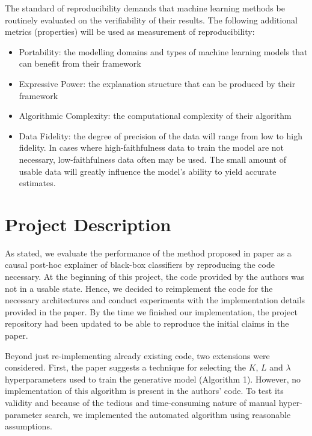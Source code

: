 The standard of reproducibility demands that machine learning methods be routinely evaluated on the verifiability of their results. The following additional metrics (properties) will be used as measurement of reproducibility:
\begin{itemize}
	\item Portability: the modelling domains and types of machine learning models that can benefit from their framework %
	\item Expressive Power: the explanation structure that can be produced by their framework
	\item Algorithmic Complexity: the computational complexity of their algorithm
	\item Data Fidelity: the degree of precision of the data will range from low to high fidelity. In cases where high-faithfulness data to train the model are not necessary, low-faithfulness data often may be used. The small amount of usable data will greatly influence the model's ability to yield accurate estimates.
\end{itemize}

\section{Project Description}
As stated, we evaluate the performance of the method proposed in paper\cite{oshaughnessy2020generative} as a causal post-hoc explainer of black-box classifiers by reproducing the code necessary. At the beginning of this project, the code provided by the authors was not in a usable state. Hence, we decided to reimplement the code for the necessary architectures and conduct experiments with the implementation details provided in the paper. By the time we finished our implementation, the project repository had been updated to be able to reproduce the initial claims in the paper. %

Beyond just re-implementing already existing code, two extensions were considered. First, the paper suggests a technique for selecting the $K$, $L$ and $\lambda$ hyperparameters used to train the generative model (Algorithm 1). However, no implementation of this algorithm is present in the authors' code. To test its validity and because of the tedious and time-consuming nature of manual hyper-parameter search, we implemented the automated algorithm using reasonable assumptions.

